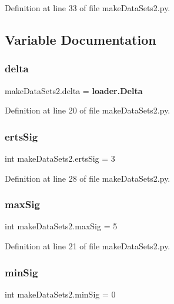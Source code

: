 Definition at line 33 of file make\+Data\+Sets2.\+py.



\subsection{Variable Documentation}
\mbox{\label{namespacemake_data_sets2_aba0f261b303fbb1532b19f02952665fa}} 
\subsubsection{delta}
{\footnotesize\ttfamily make\+Data\+Sets2.\+delta = \textbf{ loader.\+Delta}}



Definition at line 20 of file make\+Data\+Sets2.\+py.

\mbox{\label{namespacemake_data_sets2_aeaa471ab7997f692bb3dfeda0b2a8be4}} 
\subsubsection{erts\+Sig}
{\footnotesize\ttfamily int make\+Data\+Sets2.\+erts\+Sig = 3}



Definition at line 28 of file make\+Data\+Sets2.\+py.

\mbox{\label{namespacemake_data_sets2_a8bbe9012e30b3893864d537019578f56}} 
\subsubsection{max\+Sig}
{\footnotesize\ttfamily int make\+Data\+Sets2.\+max\+Sig = 5}



Definition at line 21 of file make\+Data\+Sets2.\+py.

\mbox{\label{namespacemake_data_sets2_a4f7c9b2048423f2d4845b94f9a5e4bc5}} 
\subsubsection{min\+Sig}
{\footnotesize\ttfamily int make\+Data\+Sets2.\+min\+Sig = 0}



